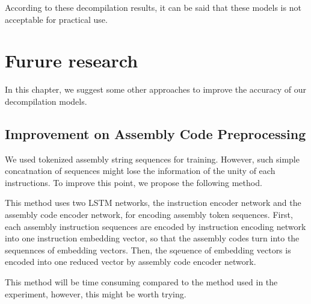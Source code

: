 \documentclass[senior,final,11pt]{iscs-thesis}
\begin{document}
According to these decompilation results, it can be said that these models is not acceptable for practical use.






\chapter{Furure research}
In this chapter, we suggest some other approaches to improve the accuracy of our decompilation models.

\section{Improvement on Assembly Code Preprocessing}
We used tokenized assembly string sequences for training. 
However, such simple concatnation of sequences might lose the information of the unity of each instructions.
To improve this point, we propose the following method.

This method uses two LSTM networks, the instruction encoder network and the assembly code encoder network, for encoding assembly token sequences.
First, each assembly instruction sequences are encoded by instruction encoding network into one instruction embedding vector, 
so that the assembly codes turn into the sequennces of embedding vectors.
Then, the sqeuence of embedding vectors is encoded into one reduced vector by assembly code encoder network.

This method will be time consuming compared to the method used in the experiment, however, this might be worth trying.
\end{document}
